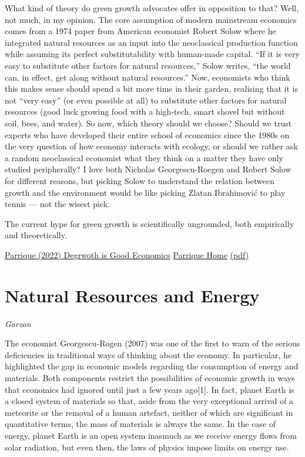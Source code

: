\documentclass[
]{book}
\begin{document}
What kind of theory do green growth advocates offer in opposition to that? Well, not
much, in my opinion. The core assumption of modern mainstream economics comes
from a 1974 paper from American economist Robert Solow where he integrated
natural resources as an input into the neoclassical production function while assuming
its perfect substitutability with human-made capital. ``If it is very easy to substitute
other factors for natural resources,'' Solow writes, ``the world can, in effect, get along
without natural resources.'' Now, economists who think this makes sense should spend
a bit more time in their garden, realising that it is not ``very easy'' (or even possible at
all) to substitute other factors for natural resources (good luck growing food with a
high-tech, smart shovel but without soil, bees, and water).
So now, which theory should we choose? Should we trust experts who have developed
their entire school of economics since the 1980s on the very question of how economy
interacts with ecology, or should we rather ask a random neoclassical economist what
they think on a matter they have only studied peripherally? I love both Nicholas
Georgescu-Roegen and Robert Solow for different reasons, but picking Solow to
understand the relation between growth and the environment would be like picking
Zlatan Ibrahimović to play tennis --- not the wisest pick.

The current hype for green
growth is scientifically ungrounded, both empirically and theoretically.

\href{https://medium.com/postgrowth/degrowth-is-good-economics-5924cfbd6735}{Parrique (2022) Degrwoth is Good Economics}
\href{https://timotheeparrique.com/a-response-to-noah-smith-is-degrowth-bad-economics/}{Parrique Home}
\href{pdf/Parrique_2022_Degrwoth_is_Good_Economics.pdf}{(pdf)}

\hypertarget{natural-resources-and-energy}{%
\section{Natural Resources and Energy}\label{natural-resources-and-energy}}

\emph{Garzon}

The economist Georgescu-Rogen (2007) was one of the first to warn of the serious deficiencies in traditional ways of thinking about the economy. In particular, he highlighted the gap in economic models regarding the consumption of energy and materials. Both components restrict the possibilities of economic growth in ways that economics had ignored until just a few years ago{[}1{]}. In fact, planet Earth is a closed system of materials so that, aside from the very exceptional arrival of a meteorite or the removal of a human artefact, neither of which are significant in quantitative terms, the mass of materials is always the same. In the case of energy, planet Earth is an open system inasmuch as we receive energy flows from solar radiation, but even then, the laws of physics impose limits on energy use.
\end{document}
